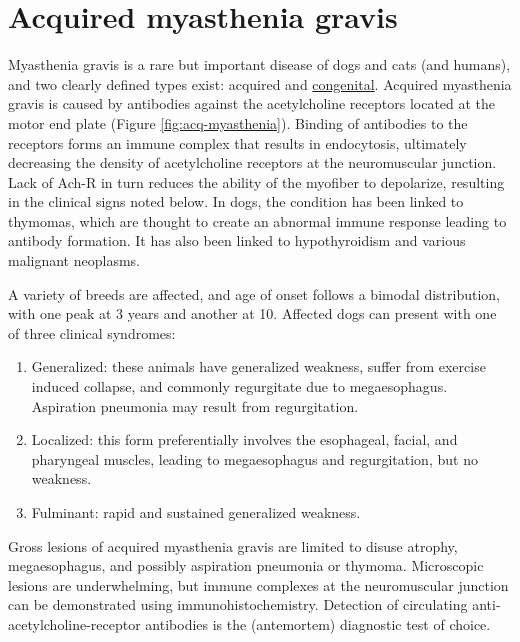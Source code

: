 \documentclass[openany]{book}
\providecommand{\tightlist}{%
  \setlength{\itemsep}{0pt}\setlength{\parskip}{0pt}}
\begin{document}
\hypertarget{acquired-myasthenia-gravis}{\section{Acquired myasthenia
gravis}\label{acquired-myasthenia-gravis}}

Myasthenia gravis is a rare but important disease of dogs and cats (and
humans), and two clearly defined types exist: acquired and
\protect\hyperlink{congenital-myasthenia-gravis}{congenital}. Acquired
myasthenia gravis is caused by antibodies against the acetylcholine
receptors located at the motor end plate (Figure
\ref{fig:acq-myasthenia}). Binding of antibodies to the receptors forms
an immune complex that results in endocytosis, ultimately decreasing the
density of acetylcholine receptors at the neuromuscular junction. Lack
of Ach-R in turn reduces the ability of the myofiber to depolarize,
resulting in the clinical signs noted below. In dogs, the condition has
been linked to thymomas, which are thought to create an abnormal immune
response leading to antibody formation. It has also been linked to
hypothyroidism and various malignant neoplasms.

A variety of breeds are affected, and age of onset follows a bimodal
distribution, with one peak at 3 years and another at 10. Affected dogs
can present with one of three clinical syndromes:

\begin{enumerate}
\def\labelenumi{\arabic{enumi}.}
\tightlist
\item
  Generalized: these animals have generalized weakness, suffer from
  exercise induced collapse, and commonly regurgitate due to
  megaesophagus. Aspiration pneumonia may result from regurgitation.
\item
  Localized: this form preferentially involves the esophageal, facial,
  and pharyngeal muscles, leading to megaesophagus and regurgitation,
  but no weakness.
\item
  Fulminant: rapid and sustained generalized weakness.
\end{enumerate}

Gross lesions of acquired myasthenia gravis are limited to disuse
atrophy, megaesophagus, and possibly aspiration pneumonia or thymoma.
Microscopic lesions are underwhelming, but immune complexes at the
neuromuscular junction can be demonstrated using immunohistochemistry.
Detection of circulating anti-acetylcholine-receptor antibodies is the
(antemortem) diagnostic test of choice.
\end{document}
